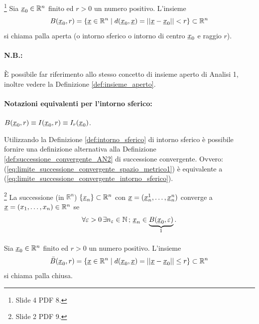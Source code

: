 \begin{definition}\label{def:intorno_sferico}\footnote{Slide 4 PDF 8.}
    Sia $\uline x_0\in\mathbb R^n$ finito ed $r>0$ un numero positivo. L'insieme
    \begin{equation}
        B(\uline x_0,r)=\{\uline x\in\mathbb R^n \;|\;d(\uline x_0, \uline x)=||\uline x-\uline x_0||<r\}\subset \mathbb R^n
    \end{equation}
    si chiama palla aperta (o intorno sferico o intorno di centro $\uline x_0$ e raggio $r$).
\end{definition}

\paragraph{N.B.:} È possibile far riferimento allo stesso concetto di insieme aperto di Analisi 1, inoltre vedere la Definizione \ref{def:insieme_aperto}.

\paragraph{Notazioni equivalenti per l'intorno sferico:} $B(\uline x_0, r)\equiv I(\uline x_0, r)\equiv I_r(\uline x_0)$.

Utilizzando la Definizione \ref{def:intorno_sferico} di intorno sferico è possibile fornire una definizione alternativa alla Definizione \ref{def:successione_convergente_AN2} di successione convergente. Ovvero: (\ref{eq:limite_successione_convergente_spazio_metrico1}) è equivalente a (\ref{eq:limite_successione_convergente_intorno_sferico}).

\begin{definition}\footnote{Slide 2 PDF 9.}
    La successione (in $\mathbb R^n$) $\{\uline x_n\}\subset\mathbb R^n$ con $\uline x=(\uline x_n^1,\hdots,\uline x_n^n)$ converge a $\uline x=(x_1,\hdots,x_n)\in\mathbb R^n$ se
    \begin{equation}\label{eq:limite_successione_convergente_intorno_sferico}
        \forall\varepsilon >0\, \exists n_\varepsilon\in\mathbb N\, ;\, \uline x_n\in \underbrace{B(\uline x_0,\varepsilon)}_{\footnotemark}.
    \end{equation}
\end{definition}

\begin{definition}
    Sia $\uline x_0\in\mathbb R^n$ finito ed $r>0$ un numero positivo. L'insieme
    \begin{equation}
        \bar{B}(\uline x_0,r)=\{\uline x\in\mathbb R^n \;|\; d(\uline x_0, \uline x)=||\uline x-\uline x_0||\leq r\}\subset \mathbb R^n
    \end{equation}
    si chiama palla chiusa.
\end{definition}

